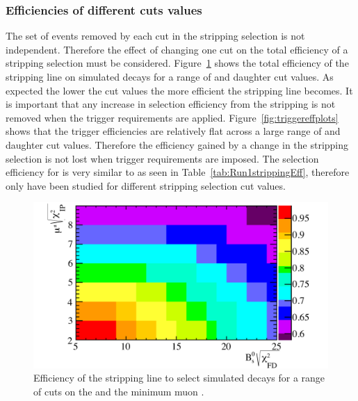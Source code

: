 




\subsubsection*{Efficiencies of different cuts values}
The set of events removed by each cut in the stripping selection is not independent. Therefore the effect of changing one cut on the total efficiency of a stripping selection must be considered. Figure~\ref{fig:efficiencyplots} shows the total efficiency of the \bsmumu stripping line on simulated \bsmumu decays for a range of \chiFD and daughter \chiIP cut values. As expected the lower the cut values the more efficient the stripping line becomes. It is important that any increase in \bsmumu selection efficiency from the stripping is not removed when the trigger requirements are applied. Figure~\ref{fig:triggereffplots} shows that the trigger efficiencies are relatively flat across a large range of \chiFD and daughter \chiIP cut values. Therefore the efficiency gained by a change in the stripping selection is not lost when trigger requirements are imposed. The selection efficiency for \bdmumu is very similar to \bsmumu as seen in Table~\ref{tab:Run1strippingEff}, therefore only \bsmumu have been studied for different stripping selection cut values. 
\clearpage


\begin{figure}[tbp]
    \centering
        \includegraphics[width= 0.9 \textwidth]{./Figs/Selection/sel_eff_chart.pdf}
    \caption{Efficiency of the \bmumu stripping line to select \bsmumu simulated decays for a range of cuts on the \bs \chiFD and the minimum muon \chiIP.}
    \label{fig:efficiencyplots}
\end{figure}

